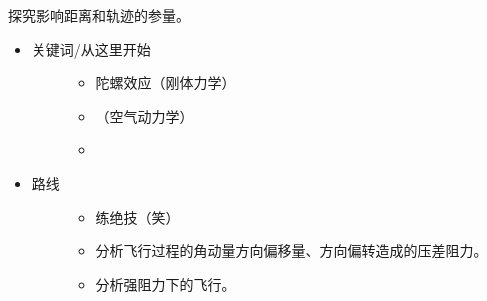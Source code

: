 \documentclass[a4paper,10pt,english]{sphinxmanual}
\begin{document}
探究影响距离和轨迹的参量。
\begin{itemize}
\item {} \begin{description}
\item[{关键词/从这里开始}] \leavevmode\begin{itemize}
\item {} 
陀螺效应（刚体力学）

\item {} 
 （空气动力学）

\item {} 

\end{itemize}

\end{description}

\item {} \begin{description}
\item[{路线}] \leavevmode\begin{itemize}
\item {} 
练绝技（笑）

\item {} 
分析飞行过程的角动量方向偏移量、方向偏转造成的压差阻力。

\item {} 
分析强阻力下的飞行。

\end{itemize}

\end{description}

\end{itemize}
\end{document}
